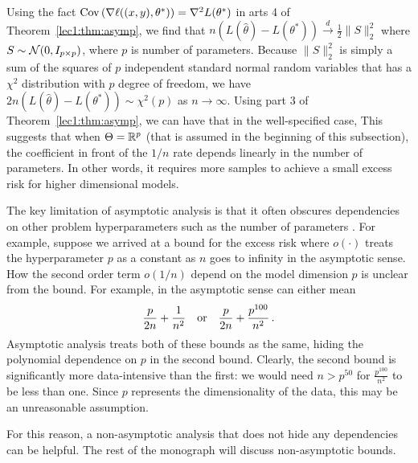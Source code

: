
Using the fact $\operatorname{Cov} \left( \nabla \ell ((x, y), \theta^*) \right) = \nabla^2 L(\theta^*)$ in arts 4 of Theorem~\ref{lec1:thm:asymp}, we find that $n (L(\hat \theta) - L(\theta^*)) \overset d \to \frac12 \|S\|_2^2$ where $S \sim \mathcal N(0, I_{p\times p})$, where $p$ is number of parameters.  Because $\|S\|_2^2$ is simply a sum of the squares of $p$ independent standard normal random variables that has a $\chi^2$ distribution with $p$ degree of freedom, we have $2n (L(\hat \theta) - L(\theta^*)) \sim  \chi^2(p)$ as $n \to \infty$. Using part 3 of Theorem~\ref{lec1:thm:asymp}, we can have that in the well-specified case,
This suggests that when $\Theta = \mathbb R^p$ (that is assumed in the beginning of this subsection), the coefficient in front of the $1/n$ rate depends linearly in the number of parameters. In other words, it requires more samples to achieve a small excess risk for higher dimensional models. 

\label{sec:limit-asymp}

The key limitation of asymptotic analysis is that it often obscures dependencies on other problem hyperparameters such as the number of parameters . For example, suppose we arrived at a bound for the excess risk
where $o(\cdot)$ treats the hyperparameter $p$ as a constant as $n$ goes to infinity in the asymptotic sense.  
How the second order term $o(1/n)$ depend on the model dimension $p$ is unclear from the bound. For example,  in the asymptotic sense can either mean  
\begin{align}
    \frac{p}{2n} + \frac{1}{n^2} \quad \text{or} \quad \frac{p}{2n} + \frac{p^{100}}{n^2}\,.
\end{align}
Asymptotic analysis treats both of these bounds as the same, hiding the polynomial dependence on $p$ in the second bound. Clearly, the second bound is significantly more data-intensive than the first: we would need $n > p^{50}$ for $\frac{p^{100}}{n^2}$ to be less than one. Since $p$ represents the dimensionality of the data, this may be an unreasonable assumption.

For this reason, a non-asymptotic analysis that does not hide any dependencies can be helpful. The rest of the monograph will discuss non-asymptotic bounds. %


